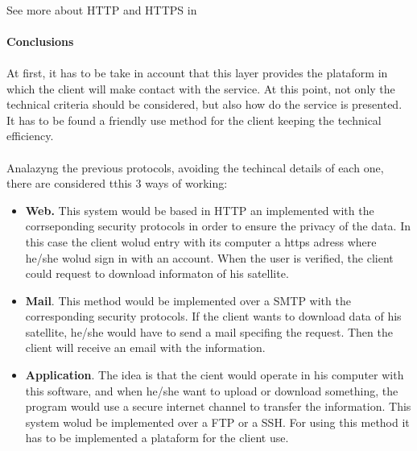 \paragraph{}
See more about HTTP and HTTPS in \cite{HTTPS}


\paragraph{} \textbf{Conclusions}
\paragraph{}
At first, it has to be take in account that this layer provides the plataform in which the client will make contact with the service. At this point, not only the technical criteria should be considered, but also how do the service is presented. It has to be found a friendly use method for the client keeping the technical efficiency.
\paragraph{}
Analazyng the previous protocols, avoiding the techincal details of each one, there are considered tthis 3 ways of working:
\begin{itemize}
\item \textbf{Web.} This system would be based in HTTP an implemented with the corrseponding security protocols in order to ensure the privacy of the data. In this case the client wolud entry with its computer a https adress where he/she wolud sign in with an account. When the user is verified, the client could request to download informaton of his satellite. 
\item \textbf{Mail}. This method would be implemented over a SMTP with the corresponding security protocols. If the client wants to download data of his satellite, he/she would have to send a mail specifing the request. Then the client will receive an email with the information.
\item \textbf{Application}.  The idea is that the cient would operate in his computer with this software, and when he/she want to upload or download something, the program would use a secure internet channel to transfer the information. This system wolud be implemented over a FTP or a SSH. For using this method it has to be implemented a plataform for the client use.
\end{itemize}

